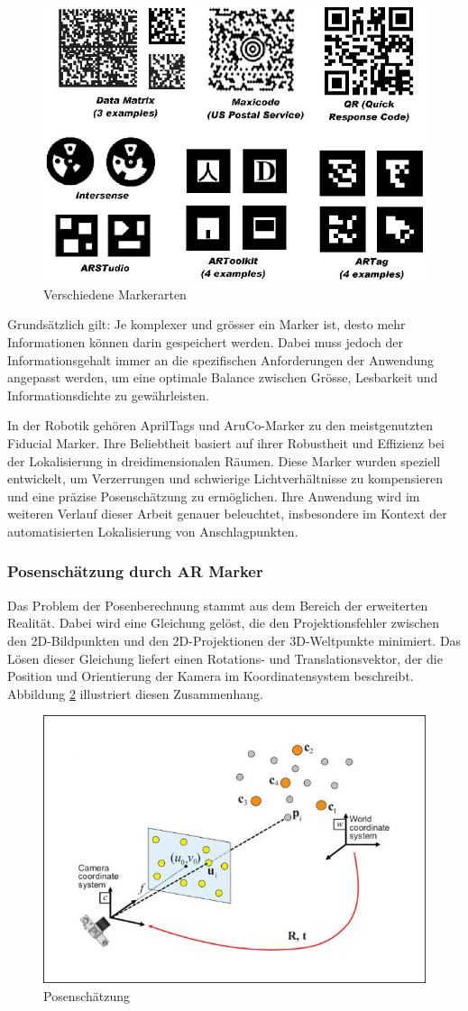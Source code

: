 \begin{figure}[H]
    \centering
    \includegraphics[width=0.5\linewidth]{graphics/marker_arten.png}
    \caption{Verschiedene Markerarten}
    \label{fig:marker_types}
\end{figure}

Grundsätzlich gilt: Je komplexer und grösser ein Marker ist, desto mehr Informationen können
darin gespeichert werden. Dabei muss jedoch der Informationsgehalt immer an die spezifischen 
Anforderungen der Anwendung angepasst werden, um eine optimale Balance zwischen Grösse, Lesbarkeit 
und Informationsdichte zu gewährleisten.

In der Robotik gehören AprilTags und AruCo-Marker zu den meistgenutzten Fiducial Marker. 
Ihre Beliebtheit basiert auf ihrer Robustheit und Effizienz bei der Lokalisierung in 
dreidimensionalen Räumen. Diese Marker wurden speziell entwickelt, um Verzerrungen und 
schwierige Lichtverhältnisse zu kompensieren und eine präzise Posenschätzung zu ermöglichen. 
Ihre Anwendung wird im weiteren Verlauf dieser Arbeit genauer beleuchtet, insbesondere im 
Kontext der automatisierten Lokalisierung von Anschlagpunkten.


\clearpage
\subsubsection{Posenschätzung durch AR Marker}
Das Problem der Posenberechnung stammt aus dem Bereich der erweiterten 
Realität. Dabei wird eine Gleichung gelöst, die den Projektionsfehler 
zwischen den 2D-Bildpunkten und den 2D-Projektionen der 3D-Weltpunkte minimiert. 
Das Lösen dieser Gleichung liefert einen Rotations- und Translationsvektor, der 
die Position und Orientierung der Kamera im Koordinatensystem beschreibt. 
Abbildung \ref{fig:pose} illustriert diesen Zusammenhang.

\begin{figure}[H]
    \centering
    \includegraphics[width=0.4\linewidth]{graphics/pose.png}
    \caption{Posenschätzung}
    \label{fig:pose}
\end{figure}

